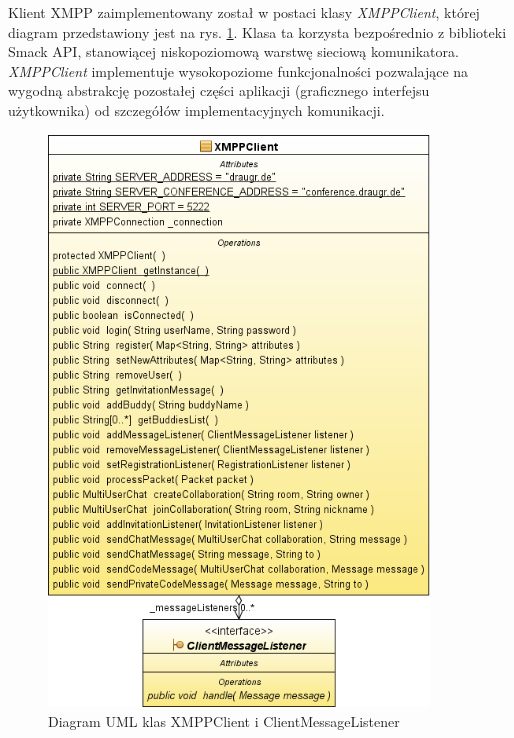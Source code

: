\documentclass[polish,11pt,a4paper,twoside]{article}
\begin{document}
Klient XMPP zaimplementowany został w postaci klasy \emph{XMPPClient}, której diagram przedstawiony jest na rys. \ref{fig:uml_class_client}. Klasa ta korzysta bezpośrednio z biblioteki Smack API, stanowiącej niskopoziomową warstwę sieciową komunikatora. \emph{XMPPClient} implementuje wysokopoziome funkcjonalności pozwalające na wygodną abstrakcję pozostałej części aplikacji (graficznego interfejsu użytkownika) od szczegółów implementacyjnych komunikacji.
\begin{figure}[!htb]
  \begin{center}
    \includegraphics[width=0.9\textwidth]{img/uml_class_client.png}
    \caption{Diagram UML klas XMPPClient i ClientMessageListener} \label{fig:uml_class_client} 
  \end{center}
\end{figure}
\end{document}
